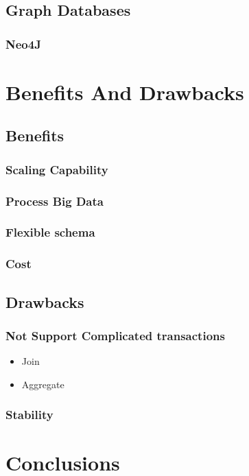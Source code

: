 \subsection{Graph Databases}


\subsubsection{Neo4J}



\section{Benefits And Drawbacks}

\subsection{Benefits}

\subsubsection{Scaling Capability}

\subsubsection{Process Big Data}

\subsubsection{Flexible schema}

\subsubsection{Cost}

\subsection{Drawbacks}

\subsubsection{Not Support Complicated transactions}

\begin{itemize}
	\item Join
	\item Aggregate
\end{itemize}

\subsubsection{Stability}

\section{Conclusions}


